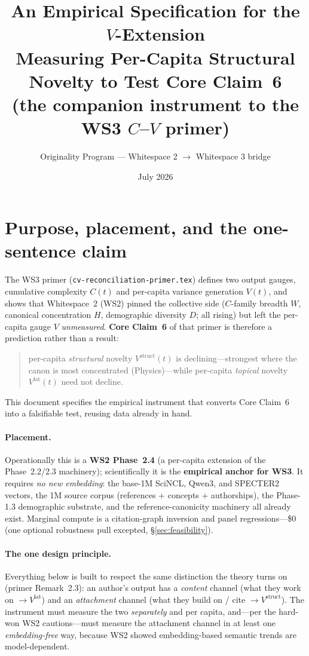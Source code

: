 \documentclass[11pt,letterpaper]{article}
\title{\textbf{An Empirical Specification for the $V$-Extension}\\[2pt]
\large Measuring Per-Capita Structural Novelty to Test Core Claim~6\\
\normalsize (the companion instrument to the WS3 $C$--$V$ primer)}
\author{Originality Program --- Whitespace 2 $\to$ Whitespace 3 bridge}
\date{July 2026}
\theoremstyle{definition}
\theoremstyle{plain}
\newcommand{\Vstruct}{V^{\mathrm{struct}}}
\newcommand{\Vlat}{V^{\mathrm{lat}}}
\begin{document}
\maketitle
\tableofcontents
\clearpage

\section{Purpose, placement, and the one-sentence claim}

The WS3 primer (\texttt{cv-reconciliation-primer.tex}) defines two output gauges,
cumulative complexity $C(t)$ and per-capita variance generation $V(t)$, and shows
that Whitespace~2 (WS2) pinned the collective side ($C$-family breadth $W$,
canonical concentration $H$, demographic diversity $D$; all rising) but left the
per-capita gauge $V$ \emph{unmeasured}. \textbf{Core Claim~6} of that primer is
therefore a prediction rather than a result:
\begin{quote}
per-capita \emph{structural} novelty $\Vstruct(t)$ is declining---strongest where
the canon is most concentrated (Physics)---while per-capita \emph{topical}
novelty $\Vlat(t)$ need not decline.
\end{quote}
This document specifies the empirical instrument that converts Core Claim~6 into
a falsifiable test, reusing data already in hand.

\paragraph{Placement.} Operationally this is a \textbf{WS2 Phase~2.4} (a
per-capita extension of the Phase~2.2/2.3 machinery); scientifically it is the
\textbf{empirical anchor for WS3}. It requires \emph{no new embedding}: the base-1M
SciNCL, Qwen3, and SPECTER2 vectors, the 1M source corpus (references +
concepts + authorships), the Phase-1.3 demographic substrate, and the
reference-canonicity machinery all already exist. Marginal compute is a citation-graph
inversion and panel regressions---\$0 (one optional robustness pull excepted,
\S\ref{sec:feasibility}).

\paragraph{The one design principle.} Everything below is built to respect the
same distinction the theory turns on (primer Remark~2.3): an author's output has
a \emph{content} channel (what they work on $\to \Vlat$) and an \emph{attachment}
channel (what they build on / cite $\to \Vstruct$). The instrument must measure
the two \emph{separately} and per capita, and---per the hard-won WS2 cautions---must
measure the attachment channel in at least one \emph{embedding-free} way, because
WS2 showed embedding-based semantic trends are model-dependent.
\end{document}

